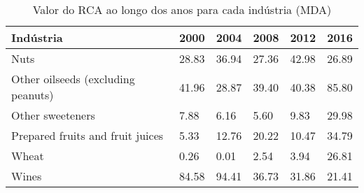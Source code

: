 \begin{table}
\centering
\caption{Valor do RCA ao longo dos anos para cada indústria (MDA)}
\label{tab:ex3-tempo-MDA}
\begin{tabular}{p{6cm}p{1.5cm}p{1.5cm}p{1.5cm}p{1.5cm}p{1.5cm}}
\toprule
                         Indústria &  2000 &  2004 &  2008 &  2012 &  2016 \\
\midrule
                              Nuts & 28.83 & 36.94 & 27.36 & 42.98 & 26.89 \\
Other oilseeds (excluding peanuts) & 41.96 & 28.87 & 39.40 & 40.38 & 85.80 \\
                  Other sweeteners &  7.88 &  6.16 &  5.60 &  9.83 & 29.98 \\
  Prepared fruits and fruit juices &  5.33 & 12.76 & 20.22 & 10.47 & 34.79 \\
                             Wheat &  0.26 &  0.01 &  2.54 &  3.94 & 26.81 \\
                             Wines & 84.58 & 94.41 & 36.73 & 31.86 & 21.41 \\
\bottomrule
\end{tabular}
\end{table}
